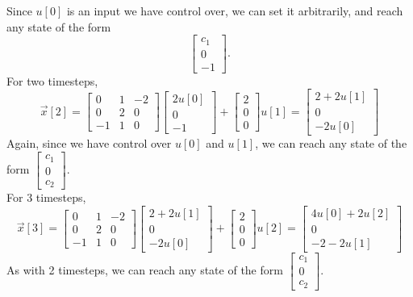 \begin{enumerate}
{        Since $u[0]$ is an input we have control over, we can set it arbitrarily, and reach any state of the form
        \[ \begin{bmatrix} c_1 \\ 0 \\ -1\end{bmatrix}. \]
        For two timesteps,
        \[\vec{x}[2] =
        \begin{bmatrix}
            0 & 1 & -2 \\
            0 & 2 & 0 \\
            -1 & 1 & 0
        \end{bmatrix}
        \begin{bmatrix}
            2u[0] \\ 0 \\ -1
        \end{bmatrix}
        + \begin{bmatrix}
            2 \\ 0 \\ 0
        \end{bmatrix} u[1] =
        \begin{bmatrix}
            2 + 2u[1] \\ 0 \\ -2u[0]
        \end{bmatrix}\]
        Again, since we have control over $u[0]$ and $u[1]$, we can reach any state of the form $\begin{bmatrix} c_1 \\ 0 \\ c_2 \end{bmatrix}$. \\
        \newline
        For 3 timesteps,
        \[\vec{x}[3] =
        \begin{bmatrix}
            0 & 1 & -2 \\
            0 & 2 & 0 \\
            -1 & 1 & 0
        \end{bmatrix}
        \begin{bmatrix}
            2 + 2u[1] \\ 0 \\ -2u[0]
        \end{bmatrix}
        + \begin{bmatrix}
            2 \\ 0 \\ 0
        \end{bmatrix} u[2] =
        \begin{bmatrix}
            4u[0] + 2u[2] \\ 0 \\ -2 - 2u[1]
        \end{bmatrix}\]
        As with 2 timesteps, we can reach any state of the form $\begin{bmatrix} c_1 \\ 0 \\ c_2 \end{bmatrix}$.
    }


\end{enumerate}

